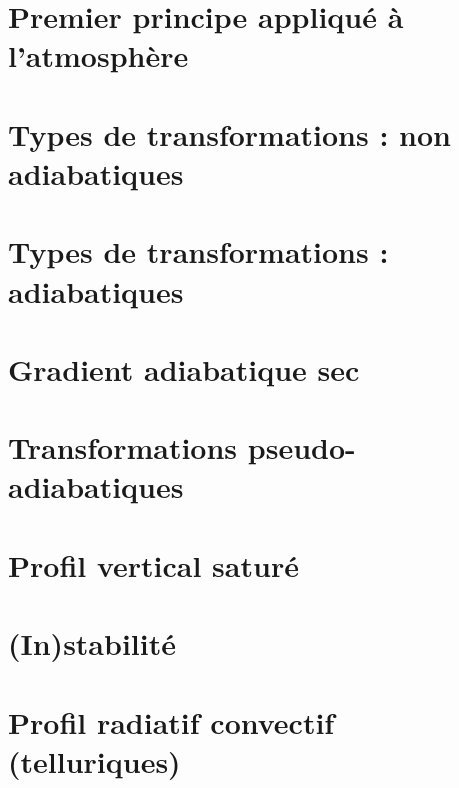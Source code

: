 \documentclass[a4paper,DIV16,10pt]{scrartcl}
\begin{document}
 \inidoc

\newpage
\section{Premier principe appliqué à l'atmosphère}


\section{Types de transformations : non adiabatiques}


\newpage
\section{Types de transformations : adiabatiques}


\newpage
\section{Gradient adiabatique sec}


\newpage
\section{Transformations pseudo-adiabatiques}


\newpage
\section{Profil vertical saturé}


\newpage
\section{(In)stabilité}


\newpage
\section{Profil radiatif convectif (telluriques)}


%
\end{document}
